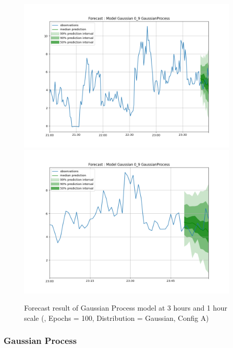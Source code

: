 \documentclass[a4paper, 12pt]{article}
\begin{document}
\begin{figure}[!h]
    \centering
    \includegraphics[width=400px]{plots/forecast/a/model/Gaussian/0_9/GaussianProcess/180.png}
    \includegraphics[width=400px]{plots/forecast/a/model/Gaussian/0_9/GaussianProcess/60.png}
    \caption{Forecast result of Gaussian Process model at 3 hours and 1 hour scale (, Epochs = 100, Distribution = Gaussian, Config A)}
    \label{fig:mqrnn}
\end{figure}

\subsubsection{Gaussian Process} \label{comp_gp}
\end{document}
